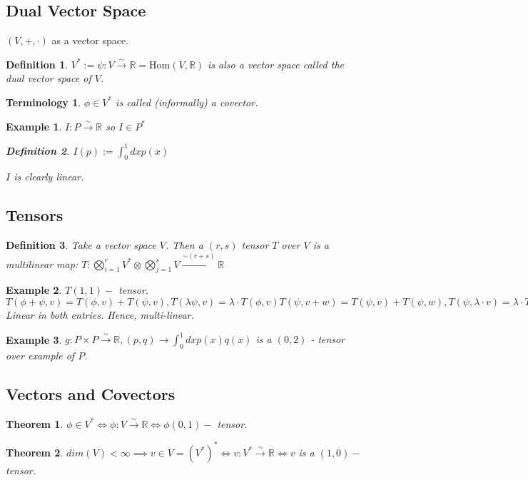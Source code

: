 \documentclass[10pt, oneside]{article}
\newcommand{\R}{\mathbb{R}}
\newtheorem{thm}{Theorem}
\newtheorem{defn}{Definition}
\newtheorem{example}{Example}
\newtheorem{Terminology}{Terminology}
\begin{document}
     \subsection{Dual Vector Space}
        $(V,+,\cdot)$ as a vector space.
        \begin{defn}
           $V^* := {\psi: V \xrightarrow{\sim} \R} = \text{Hom} (V,\R)$ is also a vector space called the dual vector space of $V$.
        \end{defn}
        \begin{Terminology}
           $\phi \in V^*$ is called (informally) a covector.
        \end{Terminology}
        \begin{example}
        $I: P \xrightarrow{\sim} \R$ so $I \in P^*$
        \begin{defn}
           $I(p) := \int_{0}^{1}dxp(x)$
        \end{defn}
        $I$ is clearly linear.
        \end{example}
     \subsection{Tensors}
     \begin{defn}
        Take a vector space $V$. Then a $(r,s)$ tensor $T$ over $V$ is a multilinear map: $T: \bigotimes_{i=1}^{r} V^* \otimes \bigotimes_{j=1}^{s} V \xrightarrow{\sim (r+s)} \R$
     \end{defn}
     \begin{example}
        $T (1,1) - $ tensor. $T(\phi+\psi,v) = T(\phi,v)+T(\psi,v), T(\lambda \psi,v)=\lambda\cdot T(\phi,v) T(\psi,v+w)=T(\psi,v)+T(\psi,w), T(\psi,\lambda\cdot v)= \lambda \cdot T(\psi,v)$ Linear in both entries. Hence, multi-linear.
     \end{example}
     \begin{example}
        $g: P \times P \xrightarrow{\sim} \R, (p,q) \rightarrow \int_{0}^{1}dx p(x) q(x)$ is a $(0,2)$ - tensor over example of $P$.
     \end{example}
     \subsection{Vectors and Covectors}
        \begin{thm}
           $\phi \in V^* \iff \phi: V \xrightarrow{\sim} \R \iff \phi(0,1) - $ tensor.
        \end{thm}
        \begin{thm}
           $dim(V) < \infty \implies v \in V = (V^*)^* \iff v: V^* \xrightarrow{\sim} \R \iff v$ is a $(1,0) -$ tensor.
        \end{thm}
\end{document}
